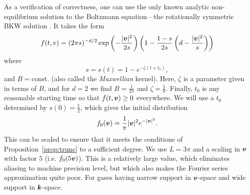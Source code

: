 As a verification of correctness, one can use the only known analytic
non-equilibrium solution to the Boltzmann equation—the rotationally symmetric BKW
solution \cite{Bobylev1975esb,Krook1977esb,Tourenne1983ebs,Ernst1984esn}. It takes the form
\begin{equation} \label{eqn:bkw}
    f(t,v) = (2\pi s)^{-d/2} \exp\left(-\frac{|{\bm v}|^2}{2s}\right)
            \left(1-\frac{1-s}{2s} \left(d-\frac{|{\bm v}|^2}{s}\right)\right)
\end{equation}
where 
\[
    s = s(t) = 1 - e^{-\zeta(t+t_0)},
\]
and $B=\text{const.}$ (also called the {\em Maxwellian} kernel). Here,
$\zeta$ is a parameter given in terms of $B$, and for $d=2$ we find
$B=\frac{1}{2\pi}$ and $\zeta = \frac{1}{8}$. Finally, $t_0$ is any
reasonable starting time so that $f(t,{\bm v})\geq0$ everywhere. We will use a
$t_0$ determined by $s(0) = \frac{1}{2}$, which gives the initial distribution
\[
    f_0({\bm v}) = \frac{1}{\pi}|{\bm v}|^2e^{-|{\bm v}|^2}.
\]
This can be scaled to ensure that it meets the conditions of Proposition~\ref{prop:trunc} to a sufficient
degree. We use $L=3\pi$ and a scaling in ${\bm v}$ with factor $5$ (i.e. $f_0(5{\bm v})$). This is a relatively
large value, which eliminates aliasing to machine precision level, but which also makes the Fourier series
approximation quite poor. For gases having narrow support in ${\bm v}$-space and wide support in ${\bm k}$-space.

